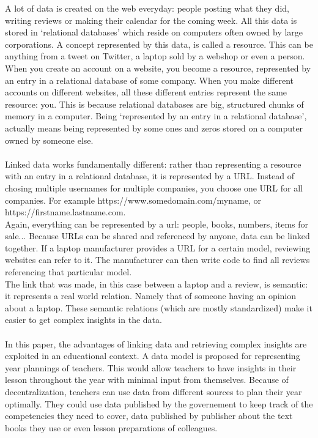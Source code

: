 \noindent A lot of data is created on the web everyday: people posting what they did, writing reviews or making their calendar for the coming week.
All this data is stored in `relational databases' which reside on computers often owned by large corporations.
A concept represented by this data, is called a resource. This can be anything from a tweet on Twitter, a laptop sold by a webshop or even a person.
When you create an account on a website, you become a resource, represented by an entry in a relational database of some company.
When you make different accounts on different websites, all these different entries represent the same resource: you.
This is because relational databases are big, structured chunks of memory in a computer.
Being `represented by an entry in a relational database', actually means being represented by some ones and zeros stored on a computer owned by someone else.\\ \\
Linked data works fundamentally different: rather than representing a resource with an entry in a relational database, it is represented by a URL.
Instead of chosing multiple usernames for multiple companies, you choose one URL for all companies. For example https://www.somedomain.com/myname, or https://firstname.lastname.com.\\
Again, everything can be represented by a url: people, books, numbers, items for sale...
Because URLs can be shared and referenced by anyone, data can be linked together.
If a laptop manufacturer provides a URL for a certain model, reviewing websites can refer to it.
The manufacturer can then write code to find all reviews referencing that particular model.\\
The link that was made, in this case between a laptop and a review, is semantic: it represents a real world relation. Namely that of someone having an opinion about a laptop.
These semantic relations (which are mostly standardized) make it easier to get complex insights in the data.\\ \\
In this paper, the advantages of linking data and retrieving complex insights are exploited in an educational context.
A data model is proposed for representing year plannings of teachers.
This would allow teachers to have insights in their lesson throughout the year with minimal input from themselves.
Because of decentralization, teachers can use data from different sources to plan their year optimally.
They could use data published by the governement to keep track of the competencies they need to cover, data published by publisher about the text books they use or even lesson preparations of colleagues.\\ \\
